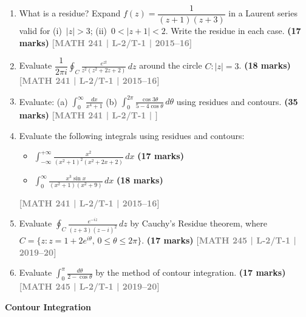 \documentclass[12pt,a4paper]{article}
\newcommand{\yr}[1]{\hfill\textcolor{gray}{\small\textbf{[#1]}}}
\newcommand{\mk}[1]{\textcolor{orange!70!black}{\small\textbf{(#1 marks)}}}
\newcommand{\subtopic}[2]{%
  \vspace{10pt}
  \noindent\begin{tcolorbox}[colback=#1!8,colframe=#1,boxrule=0.6pt,arc=4pt,
    left=6pt,right=6pt,top=4pt,bottom=4pt]
    \small\bfseries\textcolor{#1}{#2}
  \end{tcolorbox}
  \vspace{2pt}
}
\begin{document}
\begin{enumerate}
\item What is a residue? Expand $f(z)=\dfrac{1}{(z+1)(z+3)}$ in a Laurent series valid for (i)~$|z|>3$; (ii)~$0<|z+1|<2$. Write the residue in each case.
\mk{17} \yr{MATH 241 | L-2/T-1 | 2015--16}

\item Evaluate $\dfrac{1}{2\pi i}\displaystyle\oint_{C}\frac{e^{zt}}{z^{2}(z^{2}+2z+2)}\,dz$ around the circle $C:|z|=3$.
\mk{18} \yr{MATH 241 | L-2/T-1 | 2015--16}

\item Evaluate: (a) $\displaystyle\int_{0}^{\infty}\frac{dx}{x^{4}+1}$ \quad (b) $\displaystyle\int_{0}^{2\pi}\frac{\cos 3\theta}{5-4\cos\theta}\,d\theta$ using residues and contours.
\mk{35} \yr{MATH 241 | L-2/T-1 | }

\item Evaluate the following integrals using residues and contours:

\begin{itemize}
    \item[(a)] $\displaystyle \int_{-\infty}^{+\infty} \frac{x^2}{(x^2 + 1)^2 (x^2 + 2x + 2)} \, dx$
\mk{17}  
    
    \item[(b)] $\displaystyle \int_{0}^{\infty} \frac{x^3 \sin x}{(x^2 + 1)(x^2 + 9)} \, dx$
    \mk{18}
\end{itemize} 
\yr{MATH 241 | L-2/T-1 | 2015--16}

\item Evaluate $\displaystyle\oint_{C}\frac{e^{-iz}}{(z+3)(z-i)^{2}}\,dz$ by Cauchy's Residue theorem, where $C=\{z:z=1+2e^{i\theta},\,0\le\theta\le 2\pi\}$.
\mk{17} \yr{MATH 245 | L-2/T-1 | 2019--20}

\item Evaluate $\displaystyle\int_{0}^{\pi}\frac{d\theta}{2-\cos\theta}$ by the method of contour integration.
\mk{17} \yr{MATH 245 | L-2/T-1 | 2019--20}

\end{enumerate}

\subtopic{cE}{Contour Integration}
\label{sub:s5-contour}
\end{document}
